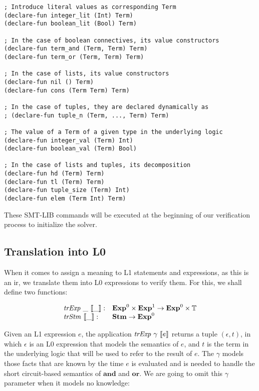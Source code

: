 \begin{verbatim}
; Introduce literal values as corresponding Term
(declare-fun integer_lit (Int) Term)
(declare-fun boolean_lit (Bool) Term)

; In the case of boolean connectives, its value constructors
(declare-fun term_and (Term, Term) Term)
(declare-fun term_or (Term, Term) Term)

; In the case of lists, its value constructors
(declare-fun nil () Term)
(declare-fun cons (Term Term) Term)

; In the case of tuples, they are declared dynamically as
; (declare-fun tuple_n (Term, ..., Term) Term)

; The value of a Term of a given type in the underlying logic
(declare-fun integer_val (Term) Int)
(declare-fun boolean_val (Term) Bool)

; In the case of lists and tuples, its decomposition
(declare-fun hd (Term) Term)
(declare-fun tl (Term) Term)
(declare-fun tuple_size (Term) Int)
(declare-fun elem (Term Int) Term)
\end{verbatim}

These SMT-LIB commands will be executed at the beginning of our verification
process to initialize the solver.

\subsection{Translation into L0}

When it comes to assign a meaning to L1 statements and expressions, as this is
an \gls{ir}, we translate them into L0 expressions to verify them. For this, we
shall define two functions:

\[
\begin{array}{ll}
\mathit{trExp}~\_~\llbracket\_\rrbracket : & \mathbf{Exp}^{0} \times \mathbf{Exp}^{1} \rightarrow \mathbf{Exp}^{0} \times \mathbb{T}\\
\mathit{trStm}~\llbracket\_\rrbracket : & \mathbf{Stm} \rightarrow \mathbf{Exp}^{0}
\end{array}
\]

Given an L1 expression $e$, the application $\mathit{trExp}~\gamma~\llbracket e\rrbracket$ returns a tuple 
$(\epsilon, t)$, in which $\epsilon$ is an L0 expression that models the
semantics of $e$, and $t$ is the term in the underlying logic that will be used
to refer to the result of $e$. The $\gamma$ models those facts that are known by
the time $e$ is evaluated and is needed to handle the short circuit-based 
semantics of $\mathbf{and}$ and $\mathbf{or}$. We are going to omit this
$\gamma$ parameter when it models no knowledge:

